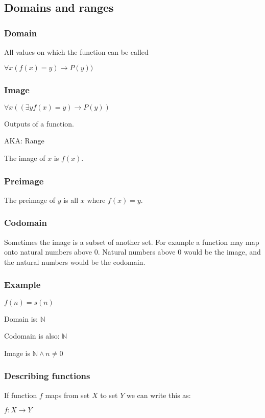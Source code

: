 
\subsection{Domains and ranges}

\subsubsection{Domain}

All values on which the function can be called

\(\forall x(f(x)=y)\rightarrow P(y))\)

\subsubsection{Image}

\(\forall x((\exists y f(x)=y)\rightarrow P(y))\)

Outputs of a function.

AKA: Range

The image of \(x\) is \(f(x)\).

\subsubsection{Preimage}

The preimage of \(y\) is all \(x\) where \(f(x)=y\).

\subsubsection{Codomain}

Sometimes the image is a subset of another set. For example a function may map onto natural numbers above \(0\). Natural numbers above \(0\) would be the image, and the natural numbers would be the codomain.

\subsubsection{Example}

\(f(n)=s(n)\)

Domain is: \(\mathbb{N}\)

Codomain is also: \(\mathbb{N}\)

Image is \(\mathbb{N}\land n\ne 0\)

\subsubsection{Describing  functions}

If function \(f\) maps from set \(X\) to set \(Y\) we can write this as:

\(f:X\rightarrow Y\)

